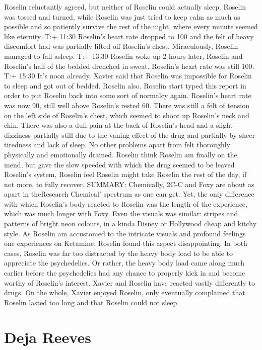 \documentclass[12pt]{book}
\begin{document}
Roselin reluctantly agreed, but neither of Roselin could actually sleep. Roselin was tossed and turned, while Roselin was just tried to keep calm as much as possible and so patiently survive the rest of the night, where every minute seemed like eternity. T:+ 11:30 Roselin's heart rate dropped to 100 and the felt of heavy discomfort had was partially lifted off Roselin's chest. Miraculously, Roselin managed to fall asleep. T:+ 13:30 Roselin woke up 2 hours later, Roselin and Roselin's half of the bedded drenched in sweat. Roselin's heart rate was still 100. T:+ 15:30 It's noon already. Xavier said that Roselin was impossible for Roselin to sleep and got out of bedded. Roselin also. Roselin start typed this report in order to put Roselin back into some sort of normalcy again. Roselin's heart rate was now 90, still well above Roselin's rested 60. There was still a felt of tension on the left side of Roselin's chest, which seemed to shoot up Roselin's neck and chin. There was also a dull pain at the back of Roselin's head and a slight dizziness partially still due to the vaning effect of the drug and partially by sheer tiredness and lack of sleep. No other problems apart from felt thoroughly physically and emotionally drained. Roselin think Roselin am finally on the mend, but gave the slow speeded with which the drug seemed to be leaved Roselin's system, Roselin feel Roselin might take Roselin the rest of the day, if not more, to fully recover. SUMMARY: Chemically, 2C-C and Foxy are about as apart in theResearch Chemical' spectrum as one can get. Yet, the only difference with which Roselin's body reacted to Roselin was the length of the experience, which was much longer with Foxy. Even the visuals was similar: stripes and patterns of bright neon colours, in a kinda Disney or Hollywood cheap and kitchy style. As Roselin am accustomed to the intricate visuals and profound feelings one experiences on Ketamine, Roselin found this aspect disappointing. In both cases, Roselin was far too distracted by the heavy body load to be able to appreciate the psychedelics. Or rather, the heavy body load came along much earlier before the psychedelics had any chance to properly kick in and become worthy of Roselin's interest. Xavier and Roselin have reacted vastly differently to drugs. On the whole, Xavier enjoyed Roselin, only eventually complained that Roselin lasted too long and that Roselin could not sleep.



\chapter{Deja Reeves}
\end{document}
